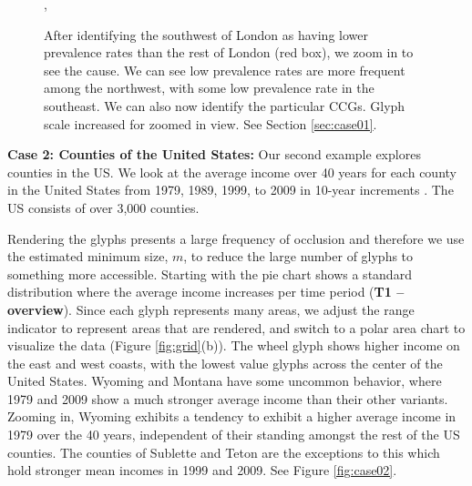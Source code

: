 \begin{figure}[t]
,
\caption{After identifying the southwest of London as having lower prevalence rates than the rest of London (red box), we zoom in to see the cause. We can see low prevalence rates are more frequent among the northwest, with some low prevalence rate in the southeast. We can also now identify the particular CCGs. Glyph scale increased for zoomed in view. See Section \ref{sec:case01}.} \label{fig:case01}
\end{figure}


\textbf{Case 2: Counties of the United States: } \label{sec:case02} 
Our second example explores counties in the US. We look at the average income over 40 years for each county in the United States from 1979, 1989, 1999, to 2009 in 10-year increments \cite{usCounties}. The US consists of over 3,000 counties.

Rendering the glyphs presents a large frequency of occlusion and therefore we use the estimated minimum size, $m$, to reduce the large number of glyphs to something more accessible.  Starting with the pie chart shows a standard distribution where the average income increases per time period (\textbf{T1 -- overview}). Since each glyph represents many areas, we adjust the range indicator to represent areas that are rendered, and switch to a polar area chart to visualize the data (Figure \ref{fig:grid}(b)). The wheel glyph shows higher income on the east and west coasts, with the lowest value glyphs across the center of the United States. Wyoming and Montana have some uncommon behavior, where 1979 and 2009 show a much stronger average income than their other variants. Zooming in, Wyoming exhibits a tendency to exhibit a higher average income in 1979 over the 40 years, independent of their standing amongst the rest of the US counties. The counties of Sublette and Teton are the exceptions to this which hold stronger mean incomes in 1999 and 2009. See Figure \ref{fig:case02}.

